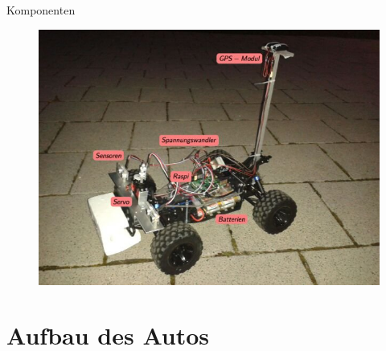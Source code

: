\begin{frame}{Komponenten}
\vspace*{-.5cm}
\begin{figure}
\center
\includegraphics[height=\textheight]{Plots/new_design_IV_new.JPG}
\end{figure}
\end{frame}%

\section{Aufbau des Autos}

